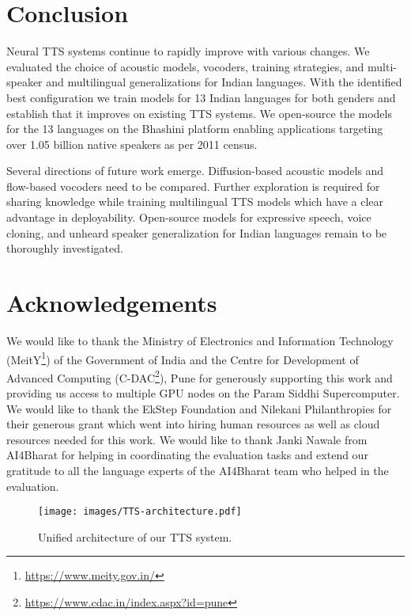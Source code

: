 \documentclass{article}
\begin{document}
\section{Conclusion}
Neural TTS systems continue to rapidly improve with various changes. 
We evaluated the choice of acoustic models, vocoders, training strategies, and multi-speaker and multilingual generalizations for Indian languages. 
With the identified best configuration we train models for 13 Indian languages for both genders and establish that it improves on existing TTS systems.
We open-source the models for the 13 languages on the Bhashini platform enabling applications targeting over 1.05 billion native speakers as per 2011 census.

Several directions of future work emerge.
Diffusion-based acoustic models and flow-based vocoders need to be compared. 
Further exploration is required for sharing knowledge while training multilingual TTS models which have a clear advantage in deployability. 
Open-source models for expressive speech, voice cloning, and unheard speaker generalization for Indian languages remain to be thoroughly investigated.

\section{Acknowledgements}

We would like to thank the Ministry of Electronics and Information Technology (MeitY\footnote{\scriptsize \url{https://www.meity.gov.in/}}) of the Government of India and the Centre for Development of Advanced Computing (C-DAC\footnote{\scriptsize \url{https://www.cdac.in/index.aspx?id=pune}}), Pune for generously supporting this work and providing us access to multiple GPU nodes on the Param Siddhi Supercomputer. We would like to thank the EkStep Foundation and Nilekani Philanthropies for their generous grant which went into hiring human resources as well as cloud resources needed for this work. We would like to thank Janki Nawale from AI4Bharat for helping in coordinating the evaluation tasks and extend our gratitude to all the language experts of the AI4Bharat team who helped in the evaluation.






\newpage\phantom{dummy}

\begin{figure*}[!h]
    \centering
    \texttt{[image: images/TTS-architecture.pdf]}
    \caption{Unified architecture of our TTS system.}
    \label{fig:unified}
\end{figure*}
\end{document}
